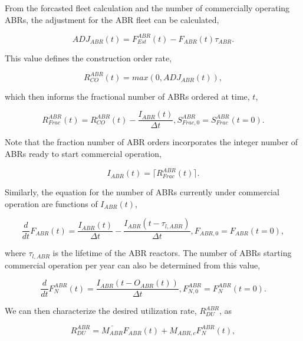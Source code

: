 From the forcasted fleet calculation and the number of commercially operating
ABRs, the adjustment for the ABR fleet can be calculated,

\begin{equation*}
 ADJ_{ABR}(t) = {F_{Est}^{ABR}(t) - F_{ABR}(t)}{\tau_{ABR}}.
\end{equation*}

This value defines the construction order rate,

\begin{equation*}
 R_{CO}^{ABR}(t) = max \left( 0, ADJ_{ABR}(t) \right),
\end{equation*}

which then informs the fractional number of ABRs ordered at time, $t$, 

\begin{equation*}
 R^{ABR}_{Frac}(t) = R_{CO}^{ABR}(t) - \frac{I_{ABR}(t)}{\Delta t}, S^{ABR}_{Frac,0} = S^{ABR}_{Frac}(t=0).
\end{equation*}

Note that the fraction number of ABR orders incorporates the integer number of
ABRs ready to start commercial operation,

\begin{equation*}
 I_{ABR}(t) = \lceil R^{ABR}_{Frac}(t) \rceil.
\end{equation*}

Similarly, the equation for the number of ABRs currently under commercial
operation are functions of $I_{ABR}(t)$,

\begin{equation*}
 \frac{d}{dt} F_{ABR}(t) = \frac{I_{ABR}(t)}{\Delta t} - \frac{I_{ABR}(t-\tau_{l,ABR})}{\Delta t}, F_{ABR,0} = F_{ABR}(t=0),
\end{equation*}

where $\tau_{l,ABR}$ is the lifetime of the ABR reactors. The number of ABRs
starting commercial operation per year can also be determined from this value,

\begin{equation*}
 \frac{d}{dt} F_N^{ABR}(t) = \frac{I_{ABR}(t - O_{ABR}(t))}{\Delta t}, F^{ABR}_{N,0} = F^{ABR}_{N}(t=0).
\end{equation*}

We can then characterize the desired utilization rate, $R^{ABR}_{DU}$, as

\begin{equation*}
 R^{ABR}_{DU} = \bar{M_{ABR}} F_{ABR}(t) + M_{ABR,c} F_N^{ABR}(t),
\end{equation*}

